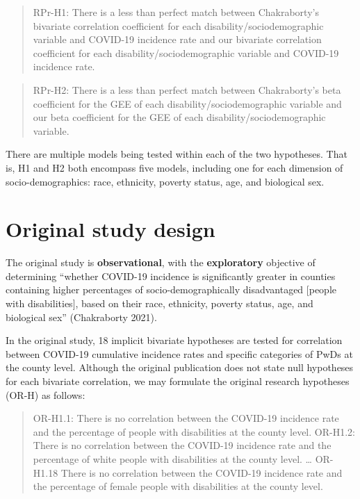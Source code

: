 \documentclass[
]{article}
\begin{document}
\begin{quote}
RPr-H1: There is a less than perfect match between Chakraborty's
bivariate correlation coefficient for each disability/sociodemographic
variable and COVID-19 incidence rate and our bivariate correlation
coefficient for each disability/sociodemographic variable and COVID-19
incidence rate.
\end{quote}

\begin{quote}
RPr-H2: There is a less than perfect match between Chakraborty's beta
coefficient for the GEE of each disability/sociodemographic variable and
our beta coefficient for the GEE of each disability/sociodemographic
variable.
\end{quote}

There are multiple models being tested within each of the two
hypotheses. That is, H1 and H2 both encompass five models, including one
for each dimension of socio-demographics: race, ethnicity, poverty
status, age, and biological sex.

\hypertarget{original-study-design}{%
\section{Original study design}\label{original-study-design}}

The original study is \textbf{observational}, with the
\textbf{exploratory} objective of determining ``whether COVID-19
incidence is significantly greater in counties containing higher
percentages of socio-demographically disadvantaged {[}people with
disabilities{]}, based on their race, ethnicity, poverty status, age,
and biological sex'' (Chakraborty 2021).

In the original study, 18 implicit bivariate hypotheses are tested for
correlation between COVID-19 cumulative incidence rates and specific
categories of PwDs at the county level. Although the original
publication does not state null hypotheses for each bivariate
correlation, we may formulate the original research hypotheses (OR-H) as
follows:

\begin{quote}
OR-H1.1: There is no correlation between the COVID-19 incidence rate and
the percentage of people with disabilities at the county level. OR-H1.2:
There is no correlation between the COVID-19 incidence rate and the
percentage of white people with disabilities at the county level.
\ldots{} OR-H1.18 There is no correlation between the COVID-19 incidence
rate and the percentage of female people with disabilities at the county
level.
\end{quote}
\end{document}
